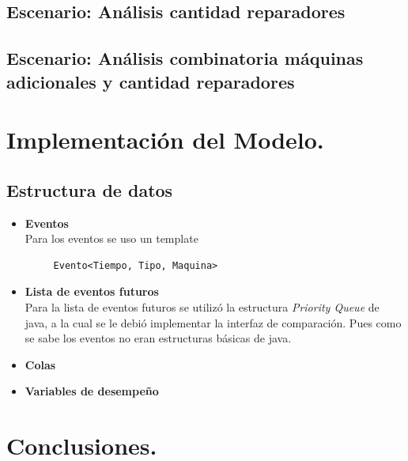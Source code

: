 \documentclass[12pt]{article}
\begin{document}
\subsection{Escenario: An\'alisis cantidad reparadores}
\subsection{Escenario: An\'alisis combinatoria m\'aquinas adicionales y cantidad reparadores}



\section{Implementación del Modelo.}

\subsection{Estructura de datos}
\begin{itemize}

	 \item \textbf{Eventos}\\
	 Para los eventos se uso un template 
	 \begin{verbatim}
	 Evento<Tiempo, Tipo, Maquina>
	 \end{verbatim}
	 \item \textbf{Lista de eventos futuros}\\
	 Para la lista de eventos futuros se utilizó la estructura \emph{Priority Queue} de java, a la cual se le debi\'o implementar la interfaz de comparaci\'on. Pues como se sabe los eventos no eran estructuras b\'asicas de java.
 	 \item \textbf{Colas}\\
 	 
 	 \item \textbf{Variables de desempeño}\\
 	 
\end{itemize}


\section{Conclusiones.}
\end{document}
